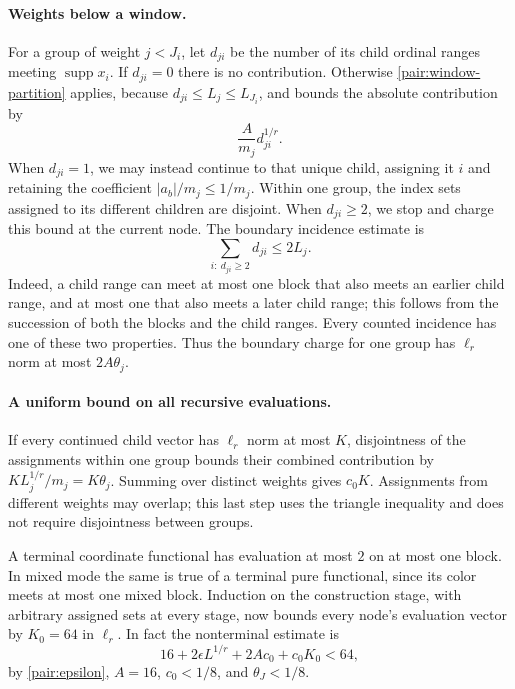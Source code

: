 \paragraph{Weights below a window.}
For a group of weight $j<J_i$, let $d_{ji}$ be the number of its child
ordinal ranges meeting $\operatorname{supp}x_i$.  If $d_{ji}=0$ there is no
contribution.  Otherwise \eqref{pair:window-partition} applies, because
$d_{ji}\le L_j\le L_{J_i}$, and bounds the absolute contribution by
\[
 \frac{A}{m_j}d_{ji}^{1/r}.
\]
When $d_{ji}=1$, we may instead continue to that unique child, assigning
it $i$ and retaining the coefficient $|a_b|/m_j\le1/m_j$.  Within one
group, the index sets assigned to its different children are disjoint.
When $d_{ji}\ge2$, we stop and charge this bound at the current node.
The boundary incidence estimate is
\begin{equation}\label{pair:incidence}
 \sum_{i:\ d_{ji}\ge2}d_{ji}\le2L_j.
\end{equation}
Indeed, a child range can meet at most one block that also meets an
earlier child range, and at most one that also meets a later child range;
this follows from the succession of both the blocks and the child ranges.
Every counted incidence has one of these two properties.  Thus the
boundary charge for one group has $\ell_r$ norm at most $2A\theta_j$.

\paragraph{A uniform bound on all recursive evaluations.}
If every continued child vector has $\ell_r$ norm at most $K$, disjointness
of the assignments within one group bounds their combined contribution by
$K L_j^{1/r}/m_j=K\theta_j$.  Summing over distinct weights gives $c_0K$.
Assignments from different weights may overlap; this last step uses the
triangle inequality and does not require disjointness between groups.

A terminal coordinate functional has evaluation at most $2$ on at most
one block.  In mixed mode the same is true of a terminal pure functional,
since its color meets at most one mixed block.  Induction on the
construction stage, with arbitrary assigned sets at every stage, now
bounds every node's evaluation vector by $K_0=64$ in $\ell_r$.  In fact
the nonterminal estimate is
\[
 16+2\epsilon L^{1/r}+2A c_0+c_0K_0<64,
\]
by \eqref{pair:epsilon}, $A=16$, $c_0<1/8$, and $\theta_J<1/8$.

